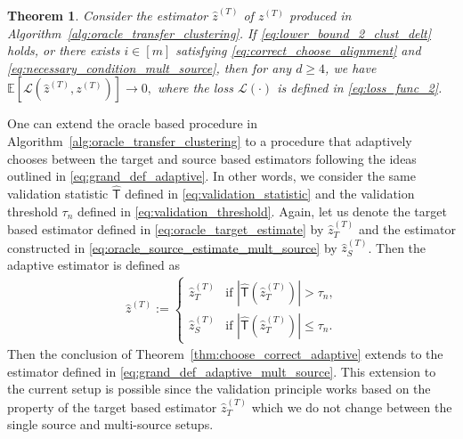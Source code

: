 \documentclass[10pt]{article}
\newtheorem{theorem}{Theorem}
\newcommand{\wh}{\widehat}
\newcommand{\calL}{\mathcal L}
\newcommand{\trg}{T}
\newcommand{\ztar}{z^{(\trg)}}
\newcommand{\hatztar}{\wh{z}^{(\trg)}}
\newcommand{\rmT}{\mathsf{T}}
\newcommand{\src}{S}
\begin{document}
\begin{theorem}
    \label{thm:two_clust_multi_source}
Consider the estimator $\hatztar$ of $\ztar$ produced in Algorithm~\ref{alg:oracle_transfer_clustering}. If \eqref{eq:lower_bound_2_clust_delt} holds, or there exists $i \in [m]$ satisfying \eqref{eq:correct_choose_alignment} and \eqref{eq:necessary_condition_mult_source}, then for any $d \ge 4$, we have $\mathbb E\left[\calL\left(\hatztar,\ztar\right)\right]\to 0,$ where the loss $\calL(\cdot)$ is defined in \eqref{eq:loss_func_2}.
\end{theorem}
One can extend the oracle based procedure in Algorithm~\ref{alg:oracle_transfer_clustering} to a procedure that adaptively chooses between the target and source based estimators following the ideas outlined in \eqref{eq:grand_def_adaptive}. In other words, we consider the same validation statistic $\wh{\rmT}$ defined in \eqref{eq:validation_statistic} and the validation threshold $\tau_n$ defined in \eqref{eq:validation_threshold}. Again, let us denote the target based estimator defined in \eqref{eq:oracle_target_estimate} by $\hatztar_{\trg}$ and the estimator constructed in \eqref{eq:oracle_source_estimate_mult_source} by $\hatztar_{\src}$.
Then the adaptive estimator is defined as 
\begin{align}
\label{eq:grand_def_adaptive_mult_source}
    \hatztar:=\begin{cases}
        \hatztar_{\trg} & \mbox{if $|\wh{\rmT}(\hatztar_{\trg})|>\tau_n$,}\\
        \hatztar_{\src} & \mbox{if $|\wh{\rmT}(\hatztar_{\trg})|\le\tau_n$.}
    \end{cases}
\end{align}
Then the conclusion of Theorem~\ref{thm:choose_correct_adaptive} extends to the estimator defined in \eqref{eq:grand_def_adaptive_mult_source}. This extension to the current setup is possible since the validation principle works based on the property of the target based estimator $\hatztar_{\trg}$ which we do not change between the single source and multi-source setups. 
\end{document}
